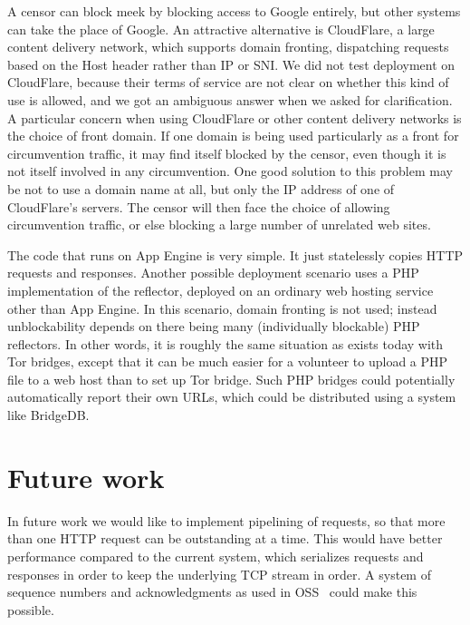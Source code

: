 \documentclass{article}
\begin{document}
A censor can block meek by blocking access to Google entirely,
but other systems can take the place of Google.
An attractive alternative is CloudFlare, a large content delivery network,
which supports domain fronting, dispatching requests based on the Host header
rather than IP or SNI.
We did not test deployment on CloudFlare,
because their terms of service are not clear on whether this kind of use is allowed,
and we got an ambiguous answer when we asked for clarification.
A particular concern when using CloudFlare or other content delivery networks is the choice of front domain.
If one domain is being used particularly as a front for circumvention traffic,
it may find itself blocked by the censor, even though it is not itself
involved in any circumvention.
One good solution to this problem may be not to use a domain name at all,
but only the IP address of one of CloudFlare's servers.
The censor will then face the choice of allowing circumvention traffic,
or else blocking a large number of unrelated web sites.


The code that runs on App Engine is very simple.
It just statelessly copies HTTP requests and responses.
Another possible deployment scenario uses a PHP implementation of the reflector,
deployed on an ordinary web hosting service other than App Engine.
In this scenario, domain fronting is not used;
instead unblockability depends on there being many (individually blockable) PHP reflectors.
In other words, it is roughly the same situation as exists today with Tor bridges,
except that it can be much easier for a volunteer to upload a PHP file to a web host
than to set up Tor bridge.
Such PHP bridges could potentially automatically report their own URLs,
which could be distributed using a system like BridgeDB.

\section{Future work}

In future work we would like to implement pipelining of requests,
so that more than one HTTP request can be outstanding at a time.
This would have better performance compared to the current system,
which serializes requests and responses in order to keep the
underlying TCP stream in order.
A system of sequence numbers and acknowledgments as used in OSS~\cite{oss}
could make this possible.
\end{document}

